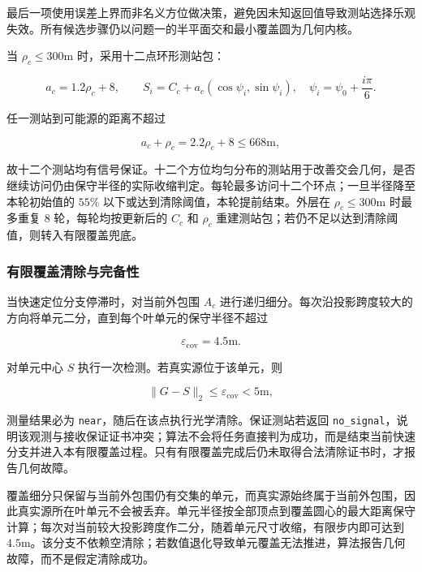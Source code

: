最后一项使用误差上界而非名义方位做决策，避免因未知返回值导致测站选择乐观失效。所有候选步骤仍以问题一的半平面交和最小覆盖圆为几何内核。

当 $\rho_c\le300\mathrm{m}$ 时，采用十二点环形测站包：

\begin{equation}
a_c=1.2\rho_c+8,
\qquad
S_i=C_c+a_c\left(\cos\psi_i,\sin\psi_i\right),
\quad
\psi_i=\psi_0+\frac{i\pi}{6}.
\label{eq:q3_packet_sites}
\end{equation}

任一测站到可能源的距离不超过

\begin{equation}
a_c+\rho_c=2.2\rho_c+8\le668\mathrm{m},
\label{eq:q3_packet_receive}
\end{equation}

故十二个测站均有信号保证。十二个方位均匀分布的测站用于改善交会几何，是否继续访问仍由保守半径的实际收缩判定。每轮最多访问十二个环点；一旦半径降至本轮初始值的 $55\%$ 以下或达到清除阈值，本轮提前结束。外层在 $\rho_c\le300\mathrm{m}$ 时最多重复 8 轮，每轮均按更新后的 $C_c$ 和 $\rho_c$ 重建测站包；若仍不足以达到清除阈值，则转入有限覆盖兜底。

\subsubsection{有限覆盖清除与完备性}

当快速定位分支停滞时，对当前外包围 $A_c$ 进行递归细分。每次沿投影跨度较大的方向将单元二分，直到每个叶单元的保守半径不超过

\begin{equation}
\varepsilon_{\mathrm{cov}}=4.5\mathrm{m}.
\label{eq:q3_cover_radius}
\end{equation}

对单元中心 $S$ 执行一次检测。若真实源位于该单元，则

\begin{equation}
\lVert G-S\rVert_2\le\varepsilon_{\mathrm{cov}}<5\mathrm{m},
\label{eq:q3_near_guarantee}
\end{equation}

测量结果必为 \texttt{near}，随后在该点执行光学清除。保证测站若返回 \texttt{no\_signal}，说明该观测与接收保证证书冲突；算法不会将任务直接判为成功，而是结束当前快速分支并进入本有限覆盖过程。只有有限覆盖完成后仍未取得合法清除证书时，才报告几何故障。

覆盖细分只保留与当前外包围仍有交集的单元，而真实源始终属于当前外包围，因此真实源所在叶单元不会被丢弃。单元半径按全部顶点到覆盖圆心的最大距离保守计算；每次对当前较大投影跨度作二分，随着单元尺寸收缩，有限步内即可达到 $4.5\mathrm{m}$。该分支不依赖空清除；若数值退化导致单元覆盖无法推进，算法报告几何故障，而不是假定清除成功。

